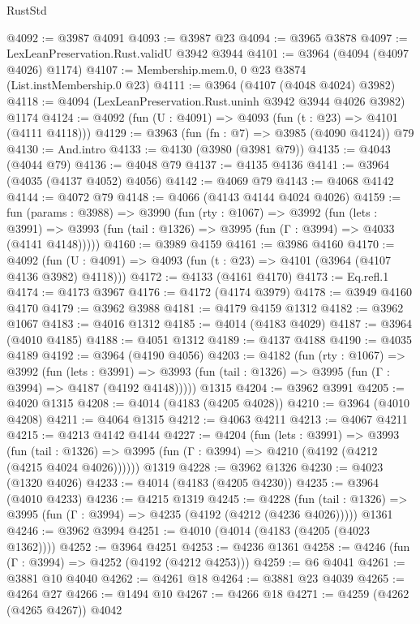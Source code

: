 \begin{lexlean}{RustStd}
\begin{coremodule}
{\begin{coremodule}
{{{{{{{{{{{{{{{{{{{{{{{{{{{{{{{{{{{{{{@4092 := @3987 @4091
@4093 := @3987 @23
@4094 := @3965 @3878
@4097 := LexLeanPreservation.Rust.validU @3942 @3944
@4101 := @3964 (@4094 (@4097 @4026) @1174)
@4107 := Membership.mem.{0, 0} @23 @3874 (List.instMembership.{0} @23)
@4111 := @3964 (@4107 (@4048 @4024) @3982)
@4118 := @4094 (LexLeanPreservation.Rust.uninh @3942 @3944 @4026 @3982) @1174
@4124 := @4092 (fun (U : @4091) => @4093 (fun (t : @23) => @4101 (@4111 @4118)))
@4129 := @3963 (fun (fn : @7) => @3985 (@4090 @4124)) @79
@4130 := And.intro
@4133 := @4130 (@3980 (@3981 @79))
@4135 := @4043 (@4044 @79)
@4136 := @4048 @79
@4137 := @4135 @4136
@4141 := @3964 (@4035 (@4137 @4052) @4056)
@4142 := @4069 @79
@4143 := @4068 @4142
@4144 := @4072 @79
@4148 := @4066 (@4143 @4144 @4024 @4026)
@4159 := fun (params : @3988) =>
  @3990
    (fun (rty : @1067) =>
    @3992
      (fun (lets : @3991) =>
      @3993 (fun (tail : @1326) => @3995 (fun (Γ : @3994) => @4033 (@4141 @4148)))))
@4160 := @3989 @4159
@4161 := @3986 @4160
@4170 := @4092 (fun (U : @4091) => @4093 (fun (t : @23) => @4101 (@3964 (@4107 @4136 @3982) @4118)))
@4172 := @4133 (@4161 @4170)
@4173 := Eq.refl.{1}
@4174 := @4173 @3967
@4176 := @4172 (@4174 @3979)
@4178 := @3949 @4160 @4170
@4179 := @3962 @3988
@4181 := @4179 @4159 @1312
@4182 := @3962 @1067
@4183 := @4016 @1312
@4185 := @4014 (@4183 @4029)
@4187 := @3964 (@4010 @4185)
@4188 := @4051 @1312
@4189 := @4137 @4188
@4190 := @4035 @4189
@4192 := @3964 (@4190 @4056)
@4203 := @4182
    (fun (rty : @1067) =>
    @3992
      (fun (lets : @3991) =>
      @3993 (fun (tail : @1326) => @3995 (fun (Γ : @3994) => @4187 (@4192 @4148)))))
    @1315
@4204 := @3962 @3991
@4205 := @4020 @1315
@4208 := @4014 (@4183 (@4205 @4028))
@4210 := @3964 (@4010 @4208)
@4211 := @4064 @1315
@4212 := @4063 @4211
@4213 := @4067 @4211
@4215 := @4213 @4142 @4144
@4227 := @4204
    (fun (lets : @3991) =>
    @3993
      (fun (tail : @1326) => @3995 (fun (Γ : @3994) => @4210 (@4192 (@4212 (@4215 @4024 @4026))))))
    @1319
@4228 := @3962 @1326
@4230 := @4023 (@1320 @4026)
@4233 := @4014 (@4183 (@4205 @4230))
@4235 := @3964 (@4010 @4233)
@4236 := @4215 @1319
@4245 := @4228
    (fun (tail : @1326) => @3995 (fun (Γ : @3994) => @4235 (@4192 (@4212 (@4236 @4026)))))
    @1361
@4246 := @3962 @3994
@4251 := @4010 (@4014 (@4183 (@4205 (@4023 @1362))))
@4252 := @3964 @4251
@4253 := @4236 @1361
@4258 := @4246 (fun (Γ : @3994) => @4252 (@4192 (@4212 @4253)))
@4259 := @6 @4041
@4261 := @3881 @10 @4040
@4262 := @4261 @18
@4264 := @3881 @23 @4039
@4265 := @4264 @27
@4266 := @1494 @10
@4267 := @4266 @18
@4271 := @4259 (@4262 (@4265 @4267)) @4042
}}}}}}}}}}}}}}}}}}}}}}}}}}}}}}}}}}}}}}
\end{coremodule}}
\end{coremodule}
\end{lexlean}
